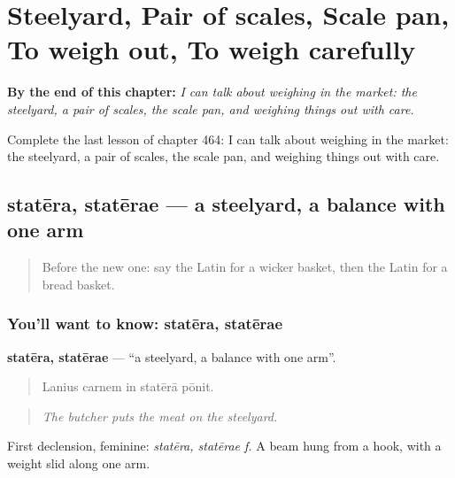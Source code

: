 
\chapter{Steelyard, Pair of scales, Scale pan, To weigh out, To weigh carefully}
\label{ch:la-steelyard-pair-of-scales-scale-pan-to-weigh-out-to-weigh-carefully}

\begin{chapteropening}
\textbf{By the end of this chapter:} \emph{I can talk about weighing in the market: the steelyard, a pair of scales, the scale pan, and weighing things out with care.}

Complete the last lesson of chapter 464: I can talk about weighing in the market: the steelyard, a pair of scales, the scale pan, and weighing things out with care.
\end{chapteropening}

\section[statēra, statērae]{statēra, statērae — a steelyard, a balance with one arm}

\label{lesson:LA-C464-statera}



\begin{quote}
Before the new one: say the Latin for a wicker basket, then the Latin for a bread basket.
\end{quote}

\subsection*{You'll want to know: statēra, statērae}
\textbf{statēra, statērae} — \textquotedblleft{}a steelyard, a balance with one arm\textquotedblright{}.

\begin{quote}
Lanius carnem in statērā pōnit.
\end{quote}

\begin{quote}
\emph{The butcher puts the meat on the steelyard.}
\end{quote}

First declension, feminine: \emph{statēra, statērae f.} A beam hung from a hook, with a weight slid along one arm.

